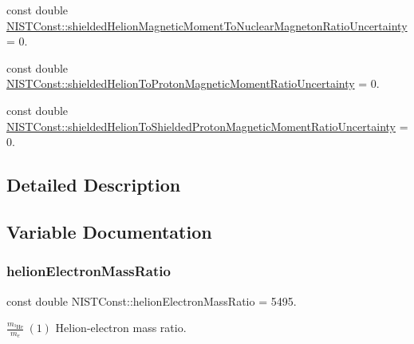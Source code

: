 \begin{DoxyCompactItemize}
const double \hyperlink{group___n_i_s_t_const-_helion_gae3df4be3b49e78f1d37afd8348e7c748}{N\+I\+S\+T\+Const\+::shielded\+Helion\+Magnetic\+Moment\+To\+Nuclear\+Magneton\+Ratio\+Uncertainty} = 0.
\item 
const double \hyperlink{group___n_i_s_t_const-_helion_gae54711a41ac3e4b0f921afc36d756604}{N\+I\+S\+T\+Const\+::shielded\+Helion\+To\+Proton\+Magnetic\+Moment\+Ratio\+Uncertainty} = 0.
\item 
const double \hyperlink{group___n_i_s_t_const-_helion_ga31b0f8bc042eedd046490ef6b86b26d4}{N\+I\+S\+T\+Const\+::shielded\+Helion\+To\+Shielded\+Proton\+Magnetic\+Moment\+Ratio\+Uncertainty} = 0.
\end{DoxyCompactItemize}


\subsection{Detailed Description}


\subsection{Variable Documentation}
\mbox{\label{group___n_i_s_t_const-_helion_ga5c779784a4f223f0936cb067e2674474}} 
\subsubsection{\texorpdfstring{helion\+Electron\+Mass\+Ratio}{helionElectronMassRatio}}
{\footnotesize\ttfamily const double N\+I\+S\+T\+Const\+::helion\+Electron\+Mass\+Ratio = 5495.}

$\frac{m_{^3\textrm{He}}}{m_e} \ (1)$ Helion-\/electron mass ratio. \mbox{\label{group___n_i_s_t_const-_helion_ga2672db60c9c3de90d9815370c208d9cf}} 

